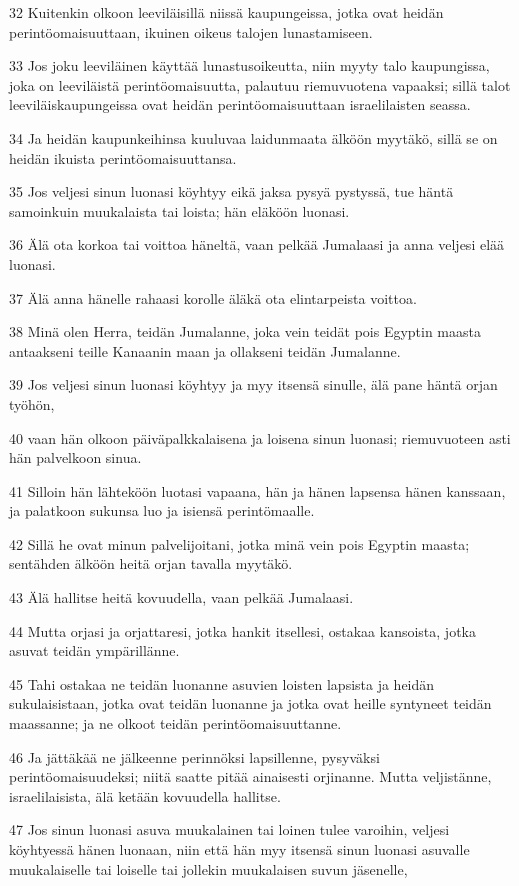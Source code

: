 \par 32 Kuitenkin olkoon leeviläisillä niissä kaupungeissa, jotka ovat heidän perintöomaisuuttaan, ikuinen oikeus talojen lunastamiseen.
\par 33 Jos joku leeviläinen käyttää lunastusoikeutta, niin myyty talo kaupungissa, joka on leeviläistä perintöomaisuutta, palautuu riemuvuotena vapaaksi; sillä talot leeviläiskaupungeissa ovat heidän perintöomaisuuttaan israelilaisten seassa.
\par 34 Ja heidän kaupunkeihinsa kuuluvaa laidunmaata älköön myytäkö, sillä se on heidän ikuista perintöomaisuuttansa.
\par 35 Jos veljesi sinun luonasi köyhtyy eikä jaksa pysyä pystyssä, tue häntä samoinkuin muukalaista tai loista; hän eläköön luonasi.
\par 36 Älä ota korkoa tai voittoa häneltä, vaan pelkää Jumalaasi ja anna veljesi elää luonasi.
\par 37 Älä anna hänelle rahaasi korolle äläkä ota elintarpeista voittoa.
\par 38 Minä olen Herra, teidän Jumalanne, joka vein teidät pois Egyptin maasta antaakseni teille Kanaanin maan ja ollakseni teidän Jumalanne.
\par 39 Jos veljesi sinun luonasi köyhtyy ja myy itsensä sinulle, älä pane häntä orjan työhön,
\par 40 vaan hän olkoon päiväpalkkalaisena ja loisena sinun luonasi; riemuvuoteen asti hän palvelkoon sinua.
\par 41 Silloin hän lähteköön luotasi vapaana, hän ja hänen lapsensa hänen kanssaan, ja palatkoon sukunsa luo ja isiensä perintömaalle.
\par 42 Sillä he ovat minun palvelijoitani, jotka minä vein pois Egyptin maasta; sentähden älköön heitä orjan tavalla myytäkö.
\par 43 Älä hallitse heitä kovuudella, vaan pelkää Jumalaasi.
\par 44 Mutta orjasi ja orjattaresi, jotka hankit itsellesi, ostakaa kansoista, jotka asuvat teidän ympärillänne.
\par 45 Tahi ostakaa ne teidän luonanne asuvien loisten lapsista ja heidän sukulaisistaan, jotka ovat teidän luonanne ja jotka ovat heille syntyneet teidän maassanne; ja ne olkoot teidän perintöomaisuuttanne.
\par 46 Ja jättäkää ne jälkeenne perinnöksi lapsillenne, pysyväksi perintöomaisuudeksi; niitä saatte pitää ainaisesti orjinanne. Mutta veljistänne, israelilaisista, älä ketään kovuudella hallitse.
\par 47 Jos sinun luonasi asuva muukalainen tai loinen tulee varoihin, veljesi köyhtyessä hänen luonaan, niin että hän myy itsensä sinun luonasi asuvalle muukalaiselle tai loiselle tai jollekin muukalaisen suvun jäsenelle,
